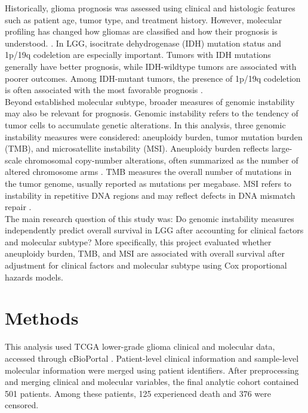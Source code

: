 \documentclass[paper=a4, fontsize=11pt]{scrartcl}
\numberwithin{equation}{section}		%
\numberwithin{figure}{section}			%
\numberwithin{table}{section}				%
\begin{document}
\noindent
Historically, glioma prognosis was assessed using clinical and histologic features such as patient age, tumor type, and treatment history. However, molecular profiling has changed how gliomas are classified and how their prognosis is understood. \cite{louis2016}. In LGG, isocitrate dehydrogenase (IDH) mutation status and 1p/19q codeletion are especially important. Tumors with IDH mutations generally have better prognosis, while IDH-wildtype tumors are associated with poorer outcomes. Among IDH-mutant tumors, the presence of 1p/19q codeletion is often associated with the most favorable prognosis \cite{tcga2015, eckelpassow2015}. \\

\noindent
Beyond established molecular subtype, broader measures of genomic instability may also be relevant for prognosis. Genomic instability refers to the tendency of tumor cells to accumulate genetic alterations. In this analysis, three genomic instability measures were considered: aneuploidy burden, tumor mutation burden (TMB), and microsatellite instability (MSI). Aneuploidy burden reflects large-scale chromosomal copy-number alterations, often summarized as the number of altered chromosome arms \cite{taylor2018}. TMB measures the overall number of mutations in the tumor genome, usually reported as mutations per megabase. MSI refers to instability in repetitive DNA regions and may reflect defects in DNA mismatch repair \cite{tcga2015, cbioportal_lgg}. \\

\noindent
The main research question of this study was: Do genomic instability measures independently predict overall survival in LGG after accounting for clinical factors and molecular subtype? More specifically, this project evaluated whether aneuploidy burden, TMB, and MSI are associated with overall survival after adjustment for clinical factors and molecular subtype using Cox proportional hazards models. 

\section{Methods} 

This analysis used TCGA lower-grade glioma clinical and molecular data, accessed through cBioPortal \cite{cbioportal_lgg}. Patient-level clinical information and sample-level molecular information were merged using patient identifiers. After preprocessing and merging clinical and molecular variables, the final analytic cohort contained 501 patients. Among these patients, 125 experienced death and 376 were censored. \\
\end{document}
